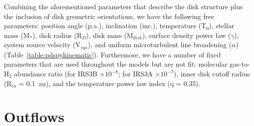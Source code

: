 Combining the aforementioned parameters that describe the disk structure plus the inclusion of disk geometric orientations, we have the following free parameters:  position angle (p.a.), inclination (inc.), temperature (T$_0$), stellar mass (M$_{*}$), disk radius (R$_D$), disk mass (M$_{disk}$), surface density power law ($\gamma$), system source velocity (V$_{sys}$), and uniform microturbulent line broadening ($\alpha$) (Table~\ref{table:pdspykinematic}). Furthermore, we have a number of fixed parameters that are used throughout the models but are not fit: molecular gas-to-H$_{2}$ abundance ratio (for IRS3B \cso{}$\times10^{-8}$; for IRS3A \htcn{}$\times10^{-7}$), inner disk cutoff radius (R$_{in}$ = 0.1~au), and the temperature power law index (q = 0.35).



\section{Outflows}\label{sec:outflow}
